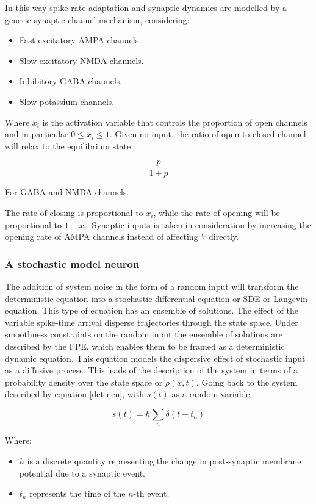 		In this way spike-rate adaptation and synaptic dynamics are modelled by a generic synaptic channel mechanism, considering:

		\begin{itemize}
			\item Fast excitatory AMPA channels.
			\item Slow excitatory NMDA channels.
			\item Inhibitory GABA channels.
			\item Slow potassium channels.
		\end{itemize}

		Where $x_i$ is the activation variable that controls the proportion of open channels and in particular $0\le x_i\le 1$.
		Given no input, the ratio of open to closed channel will relax to the equilibrium state:

		$$\frac{p}{1+p}$$

		For GABA and NMDA channels.

		The rate of closing is proportional to $x_i$, while the rate of opening will be proportional to $1-x_i$.
		Synaptic inputs is taken in consideration by increasing the opening rate of AMPA channels instead of affecting $V$ directly.

		\subsubsection{A stochastic model neuron}
		The addition of system noise in the form of a random input will transform the deterministic equation into a stochastic differential equation or SDE or Langevin equation.
		This type of equation has an ensemble of solutions.
		The effect of the variable spike-time arrival disperse trajectories through the state space.
		Under smoothness constraints on the random input the ensemble of solutions are described by the FPE, which enables them to be framed as a deterministic dynamic equation.
		This equation models the dispersive effect of stochastic input as a diffusive process.
		This leads of the description of the system in terms of a probability density over the state space or $\rho(x,t)$.
		Going back to the system described by equation \ref{det-neu}, with $s(t)$ as a random variable:

		\begin{equation}
			s(t) = h\sum\limits_n\delta(t-t_n)
		\end{equation}

		Where:

		\begin{itemize}
			\item $h$ is a discrete quantity representing the change in post-synaptic membrane potential due to a synaptic event.
			\item $t_n$ represents the time of the $n$-th event.
		\end{itemize}

